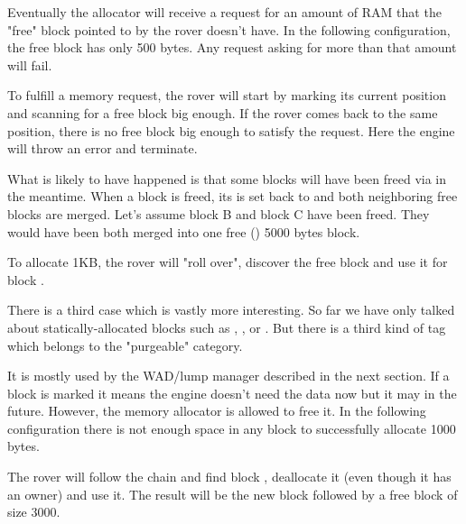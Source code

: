Eventually the allocator will receive a request for an amount of RAM that the "free" block pointed to by the rover doesn't have. In the following configuration, the free block has only 500 bytes. Any request asking for more than that amount will fail.\\
\par
{}
\par
To fulfill a memory request, the rover will start by marking its current position and scanning for a free block big enough. If the rover comes back to the same position, there is no free block big enough to satisfy the request. Here the engine will throw an error and terminate.\\
\par
What is likely to have happened is that some blocks will have been freed via  in the meantime. When a block is freed, its  is set back to  and both neighboring free blocks are merged. Let's assume block B and block C have been freed. They would have been both merged into one free () 5000 bytes block.\\
\par
{}
\par
To allocate 1KB, the rover will "roll over", discover the free block and use it for block .\\
\par
{}
\par
There is a third case which is vastly more interesting. So far we have only talked about statically-allocated blocks such as , , or . But there is a third kind of tag which belongs to the "purgeable" category.\\
\par
 It is mostly used by the WAD/lump manager described in the next section. If a block is marked  it means the engine doesn't need the data now but it may in the future. However, the memory allocator is allowed to free it. In the following configuration there is not enough space in any block to successfully allocate 1000 bytes.\\
\par
{}
\par
The rover will follow the chain and find block , deallocate it (even though it has an owner) and use it. The result will be the new block  followed by a free block of size 3000.\\

